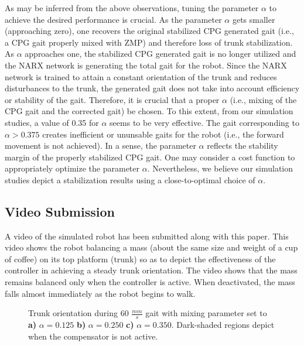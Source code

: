 As may be inferred from the above observations, tuning the parameter $\alpha$ to achieve the desired performance is crucial. 
As the parameter $\alpha$ gets smaller (approaching zero), one recovers the original stabilized CPG generated gait (i.e., a CPG gait properly mixed with ZMP) and therefore loss of trunk stabilization. As $\alpha$ approaches one, the stabilized CPG generated gait is no longer utilized and the NARX network is generating the total gait for the robot. Since the NARX network is trained to attain a constant orientation of the trunk and reduces disturbances to the trunk, the generated gait does not take into account efficiency or  stability of the gait. Therefore, it is crucial that a proper $\alpha$ (i.e., mixing of the CPG gait and the corrected gait) be chosen. To this extent, from our simulation studies, a value of 0.35 for $\alpha$ seems to be very effective. The gait corresponding to $\alpha > 0.375$ creates inefficient or ununsable gaits for the robot (i.e., the forward movement is not achieved). In a sense, the parameter $\alpha$ reflects the stability margin of the properly stabilized CPG gait. One may consider a cost function to appropriately optimize the parameter $\alpha$. Nevertheless, we believe our simulation studies depict a stabilization results using a close-to-optimal choice of $\alpha$.


\vspace{-2mm}
\subsection{Video Submission}


A video of the simulated robot has been submitted along with this paper. This video shows the robot balancing a mass (about the same size and weight of a cup of coffee) on its top platform (trunk) so as to depict the effectiveness of the controller in achieving a steady trunk orientation. The video shows that the mass remains balanced only when the controller is active. When deactivated, the mass falls almost immediately as the robot begins to walk.
%
%
%
\begin{figure}[t!]
	\centering
	\begin{subfigure}{0.475\textwidth}
		\centering
		\caption{ }
	\end{subfigure}
	\begin{subfigure}{0.475\textwidth}
		\centering
		\caption{ }
	\end{subfigure}
	\begin{subfigure}{0.475\textwidth}
		\centering
		\caption{ }
	\end{subfigure}
	\caption{ Trunk orientation during 60 $\frac{mm}{s}$ gait with mixing parameter set to
		 \textbf{a)}  $\alpha = 0.125$ 
		 \textbf{b)}  $\alpha = 0.250$ 
		 \textbf{c)}  $\alpha = 0.350$.
		Dark-shaded regions depict when the compensator is not active.
	}
	\label{fig::alpha_tests}
	\vspace{-6mm}
\end{figure}


